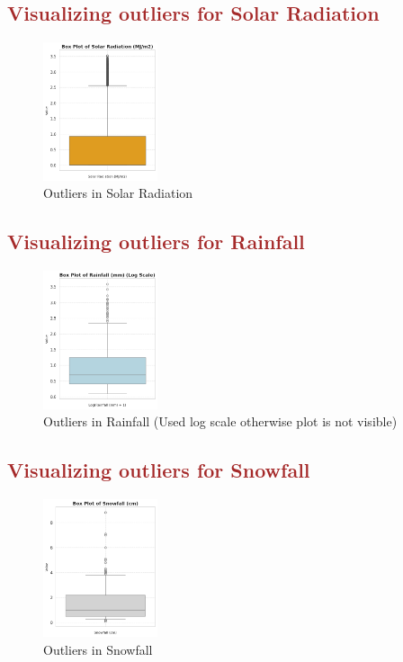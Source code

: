 \documentclass[12pt, letterpaper]{article}
\begin{document}
\subsection*{\textcolor{brown}{Visualizing outliers for Solar Radiation}}

\begin{figure}[h]
  \centering
  \includegraphics[width=0.3\textwidth]{solar2.png}
  \caption{Outliers in Solar Radiation}
\end{figure}

\newpage

\subsection*{\textcolor{brown}{Visualizing outliers for Rainfall}}

\begin{figure}[h]
  \centering
  \includegraphics[width=0.3\textwidth]{rainfall3.png}
  \caption{Outliers in Rainfall (Used log scale otherwise plot is not visible)}
\end{figure}

\subsection*{\textcolor{brown}{Visualizing outliers for Snowfall}}

\begin{figure}[h]
  \centering
  \includegraphics[width=0.3\textwidth]{snowfall2.png}
  \caption{Outliers in Snowfall}
\end{figure}
\end{document}
